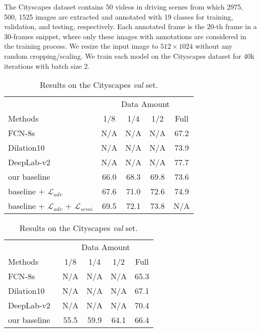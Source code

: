 \documentclass{bmvc2k}
\begin{document}
	The Cityscapes dataset contains 50 videos in driving scenes from which 
	2975, 500, 1525 images are extracted and annotated with 19 classes for training, validation, and testing, respectively.
	Each annotated frame is the $20$-{th} frame in a 30-frames snippet, where only these images with annotations are considered in the training process.
	We resize the input image to $512 \times 1024$ without any random cropping/scaling.
	We train each model on the Cityscapes dataset for 40k iterations with batch size 2.
	
	\begin{table}
		\begin{minipage}[t]{.49\linewidth}
			\scriptsize
			\caption{Results on the VOC 2012 \emph{val} set.}
			\vspace{1mm}
			\label{table: pascal}
			\centering
			\begin{tabular}{lcccc}
				\toprule
				& \multicolumn{4}{c}{Data Amount} \\
				Methods & 1/8 & 1/4 & 1/2 & Full \\
				\midrule
				FCN-8s~\cite{fcn} &N/A &N/A &N/A & 67.2 \\
				Dilation10~\cite{dilated} &N/A &N/A &N/A & 73.9 \\
				DeepLab-v2~\cite{deeplab} &N/A &N/A &N/A & 77.7 \\
				\midrule
				our baseline     & 66.0 & 68.3 & 69.8 & 73.6 \\
				baseline + $\mathcal{L}_{adv}$ & 67.6 & 71.0 & 72.6 & 74.9\\
				baseline + $\mathcal{L}_{adv}$ + $\mathcal{L}_{semi}$ & 69.5 & 72.1 & 73.8 & N/A \\
				
				\bottomrule
			\end{tabular}
		\end{minipage}
		\hfill
		\begin{minipage}[t]{.49\linewidth}
			\scriptsize
			\caption{Results on the Cityscapes \emph{val} set.}
			
			\label{table: cityscapes}
			\centering
			\begin{tabular}{lcccc}
				\toprule
				
				& \multicolumn{4}{c}{Data Amount} \\
				Methods & 1/8 & 1/4 & 1/2 & Full \\
				\midrule
				FCN-8s~\citep{fcn} &N/A &N/A &N/A & 65.3 \\
				Dilation10~\citep{dilated} &N/A &N/A &N/A & 67.1 \\
				DeepLab-v2~\citep{deeplab} &N/A &N/A &N/A & 70.4 \\
				\midrule
				our baseline     & 55.5 & 59.9 & 64.1 & 66.4 \\
				

\end{tabular}
\end{minipage}
\end{table}
\end{document}
